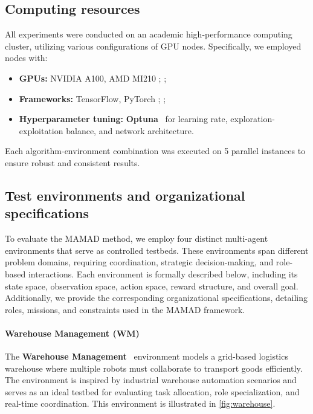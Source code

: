 \documentclass[pdflatex,sn-mathphys-num]{sn-jnl}%
\theoremstyle{thmstyleone}%
\theoremstyle{thmstyletwo}%
\theoremstyle{thmstylethree}%
\begin{document}
\subsection{Computing resources}

All experiments were conducted on an academic high-performance computing cluster, utilizing various configurations of GPU nodes. Specifically, we employed nodes with:
\begin{itemize}
    \item \textbf{GPUs:} NVIDIA A100, AMD MI210 ; ;
    \item \textbf{Frameworks:} TensorFlow, PyTorch ; ;
    \item \textbf{Hyperparameter tuning:} \textbf{Optuna}~\cite{akiba2019optuna} for learning rate, exploration-exploitation balance, and network architecture.
\end{itemize}

Each algorithm-environment combination was executed on 5 parallel instances to ensure robust and consistent results.

\subsection{Test environments and organizational specifications}

To evaluate the MAMAD method, we employ four distinct multi-agent environments that serve as controlled testbeds. These environments span different problem domains, requiring coordination, strategic decision-making, and role-based interactions. Each environment is formally described below, including its state space, observation space, action space, reward structure, and overall goal. Additionally, we provide the corresponding organizational specifications, detailing roles, missions, and constraints used in the MAMAD framework.

\paragraph{Warehouse Management (WM)}
The \textbf{Warehouse Management}~\cite{warehouse_management} environment models a grid-based logistics warehouse where multiple robots must collaborate to transport goods efficiently. The environment is inspired by industrial warehouse automation scenarios and serves as an ideal testbed for evaluating task allocation, role specialization, and real-time coordination. This environment is illustrated in \autoref{fig:warehouse}.
\end{document}
